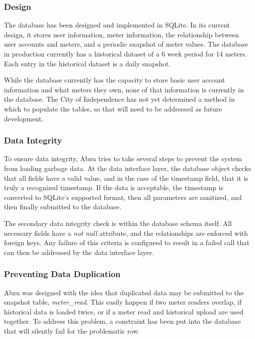 \documentclass[journal]{IEEEtran}
\begin{document}
\subsubsection{Design}
The database has been designed and implemented in SQLite. In its current design, it stores user information, meter information, the relationship between user accounts and meters, and a periodic snapshot of meter values. The database in production currently has a historical dataset of a 6 week period for 14 meters. Each entry in the historical dataset is a daily snapshot.

While the database currently has the capacity to store basic user account information and what meters they own, none of that information is currently in the database. The City of Independence has not yet determined a method in which to populate the tables, so that will need to be addressed as future development.

\subsubsection{Data Integrity}
To ensure data integrity, Abzu tries to take several steps to prevent the system from loading garbage data. At the data interface layer, the database object checks that all fields have a valid value, and in the case of the timestamp field, that it is truly a recognized timestamp. If the data is acceptable, the timestamp is converted to SQLite's supported format, then all parameters are sanitized, and then finally submitted to the database.

The secondary data integrity check is within the database schema itself. All necessary fields have a \textit{not null} attribute, and the relationships are enforced with foreign keys. Any failure of this criteria is configured to result in a failed call that can then be addressed by the data interface layer.

\subsubsection{Preventing Data Duplication}
Abzu was designed with the idea that duplicated data may be submitted to the snapshot table, \textit{meter\_read}. This easily happen if two meter readers overlap, if historical data is loaded twice, or if a meter read and historical upload are used together. To address this problem, a constraint has been put into the database that will silently fail for the problematic row.
\end{document}
